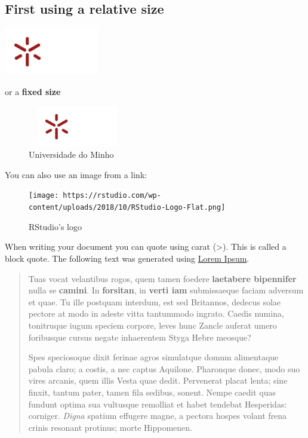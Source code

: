 \documentclass[
]{article}
\begin{document}
\hypertarget{first-using-a-relative-size}{%
\subsection{First using a relative
size}\label{first-using-a-relative-size}}

\includegraphics[width=0.31\textwidth,height=\textheight]{./images/uminho.png}

or a \textbf{fixed size}

\begin{figure}
\centering
\includegraphics[width=1.7in,height=0.7in]{./images/uminho.png}
\caption{Universidade do Minho}
\end{figure}

You can also use an image from a link:

\begin{figure}
\centering
\texttt{[image: https://rstudio.com/wp-content/uploads/2018/10/RStudio-Logo-Flat.png]}
\caption{RStudio's logo}
\end{figure}

When writing your document you can quote using carat (\textgreater).
This is called a block quote. The following text was generated using
\href{https://jaspervdj.be/lorem-markdownum/}{Lorem Ipsum}.

\begin{quote}
Tuas vocat velantibus rogos, quem tamen foedere \textbf{laetabere
bipennifer} nulla se \textbf{camini}. In \textbf{forsitan}, in
\textbf{verti iam} submissaeque faciam adversum et quae. Tu ille
postquam interdum, est sed Britannos, dedecus solae pectore at modo in
adeste vitta tantummodo ingrato. Caedis numina, tonitruque iugum speciem
corpore, leves hunc Zancle auferat umero foribusque cursus negate
inhaerentem Styga Hebre meosque?

Spes speciosoque dixit ferinae agros simulatque domum alimentaque pabula
claro; a costis, a nec captus Aquilone. Pharonque donec, modo suo vires
arcanis, quem illis Vesta quae dedit. Pervenerat placat lenta; sine
finxit, tantum pater, tamen fila sedibus, sonent. Nempe caedit quas
fundunt optima sua vultusque remolliat et habet tendebat Hesperidas:
corniger. \emph{Digna} spatium effugere magne, a pectora hospes volant
frena crinis resonant protinus; morte Hippomenen.
\end{quote}
\end{document}
